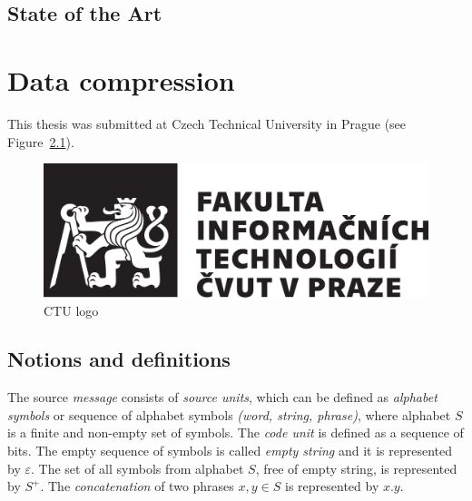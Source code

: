\documentclass[thesis=M,english]{FITthesis}[2012/10/20]
\begin{document}
\begin{introduction}
	\section{State of the Art}
	
\end{introduction}

\chapter{Data compression}\label{textcompr}

	This thesis was submitted at Czech Technical University in Prague (see Figure~\ref{fig:logo}).
	
	\begin{figure}\centering
		\includegraphics{cvut-logo-bw}
		\caption{CTU logo}\label{fig:logo}
	\end{figure}

\section{Notions and definitions}

The source \textit{message} consists of \textit{source units}, which can be defined as \textit{alphabet symbols} or sequence of alphabet symbols \textit{(word, string, phrase)}, where alphabet $S$ is a finite and non-empty set of symbols. The \textit{code unit} is defined as a sequence of bits. The empty sequence of symbols is called \textit{empty string} and it is represented by $\varepsilon$. The set of all symbols from alphabet $S$, free of empty string, is represented by $S^+$. The \textit{concatenation} of two phrases $x,y \in S$ is represented by $x.y$.
\end{document}

